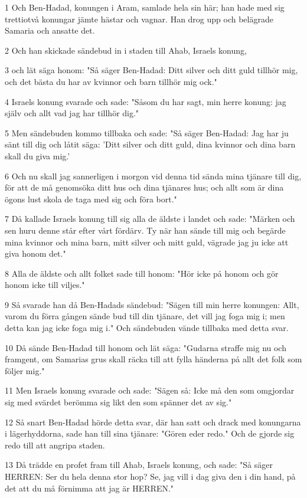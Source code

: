 \par 1 Och Ben-Hadad, konungen i Aram, samlade hela sin här; han hade med sig trettiotvå konungar jämte hästar och vagnar. Han drog upp och belägrade Samaria och ansatte det.
\par 2 Och han skickade sändebud in i staden till Ahab, Israels konung,
\par 3 och lät säga honom: "Så säger Ben-Hadad: Ditt silver och ditt guld tillhör mig, och det bästa du har av kvinnor och barn tillhör mig ock."
\par 4 Israels konung svarade och sade: "Såsom du har sagt, min herre konung: jag själv och allt vad jag har tillhör dig."
\par 5 Men sändebuden kommo tillbaka och sade: "Så säger Ben-Hadad: Jag har ju sänt till dig och låtit säga: 'Ditt silver och ditt guld, dina kvinnor och dina barn skall du giva mig.'
\par 6 Och nu skall jag sannerligen i morgon vid denna tid sända mina tjänare till dig, för att de må genomsöka ditt hus och dina tjänares hus; och allt som är dina ögons lust skola de taga med sig och föra bort."
\par 7 Då kallade Israels konung till sig alla de äldste i landet och sade: "Märken och sen huru denne står efter vårt fördärv. Ty när han sände till mig och begärde mina kvinnor och mina barn, mitt silver och mitt guld, vägrade jag ju icke att giva honom det."
\par 8 Alla de äldste och allt folket sade till honom: "Hör icke på honom och gör honom icke till viljes."
\par 9 Så svarade han då Ben-Hadads sändebud: "Sägen till min herre konungen: Allt, varom du förra gången sände bud till din tjänare, det vill jag foga mig i; men detta kan jag icke foga mig i." Och sändebuden vände tillbaka med detta svar.
\par 10 Då sände Ben-Hadad till honom och lät säga: "Gudarna straffe mig nu och framgent, om Samarias grus skall räcka till att fylla händerna på allt det folk som följer mig."
\par 11 Men Israels konung svarade och sade: "Sägen så: Icke må den som omgjordar sig med svärdet berömma sig likt den som spänner det av sig."
\par 12 Så snart Ben-Hadad hörde detta svar, där han satt och drack med konungarna i lägerhyddorna, sade han till sina tjänare: "Gören eder redo." Och de gjorde sig redo till att angripa staden.
\par 13 Då trädde en profet fram till Ahab, Israels konung, och sade: "Så säger HERREN: Ser du hela denna stor hop? Se, jag vill i dag giva den i din hand, på det att du må förnimma att jag är HERREN."
